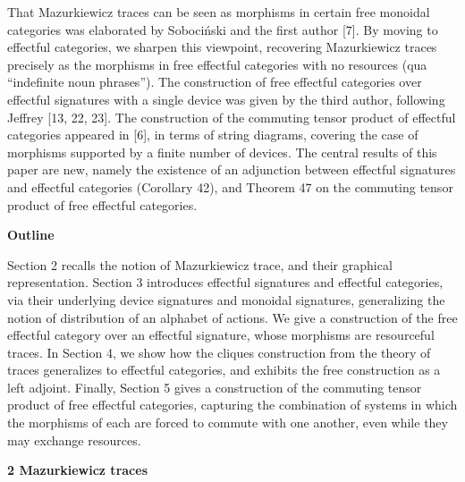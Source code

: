 \documentclass[10pt,a4paper]{article}
\begin{document}
That Mazurkiewicz traces can be seen as morphisms in certain free monoidal categories was elaborated by Sobociński and the first author [7]. By moving to effectful categories, we sharpen this viewpoint, recovering Mazurkiewicz traces precisely as the morphisms in free effectful categories with no resources (qua “indefinite noun phrases”). The construction of free effectful categories over effectful signatures with a single device was given by the third author, following Jeffrey [13, 22, 23]. The construction of the commuting tensor product of effectful categories appeared in [6], in terms of string diagrams, covering the case of morphisms supported by a finite number of devices. The central results of this paper are new, namely the existence of an adjunction between effectful signatures and effectful categories (Corollary 42), and Theorem 47 on the commuting tensor product of free effectful categories.\par
 
 
 
 
\par\medskip\noindent\textbf{Outline}\par
 
 
Section 2 recalls the notion of Mazurkiewicz trace, and their graphical representation. Section 3 introduces effectful signatures and effectful categories, via their underlying device signatures and monoidal signatures, generalizing the notion of distribution of an alphabet of actions. We give a construction of the free effectful category over an effectful signature, whose morphisms are resourceful traces. In Section 4, we show how the cliques construction from the theory of traces generalizes to effectful categories, and exhibits the free construction as a left adjoint. Finally, Section 5 gives a construction of the commuting tensor product of free effectful categories, capturing the combination of systems in which the morphisms of each are forced to commute with one another, even while they may exchange resources.\par
 
 
 


 
\par\medskip\noindent\textbf{2 Mazurkiewicz traces}\par
 
\end{document}
